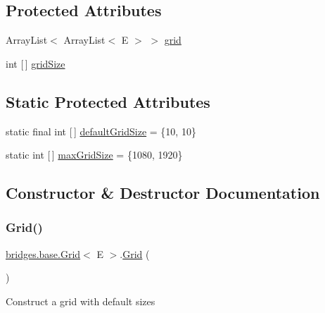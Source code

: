 \subsection*{Protected Attributes}
\begin{DoxyCompactItemize}
\item 
Array\+List$<$ Array\+List$<$ E $>$ $>$ \hyperlink{classbridges_1_1base_1_1_grid_ad1f3f6968d58188425bd992c05c655a6}{grid}
\item 
int \mbox{[}$\,$\mbox{]} \hyperlink{classbridges_1_1base_1_1_grid_a54a66479f78022570253d771206a0420}{grid\+Size}
\end{DoxyCompactItemize}
\subsection*{Static Protected Attributes}
\begin{DoxyCompactItemize}
\item 
static final int \mbox{[}$\,$\mbox{]} \hyperlink{classbridges_1_1base_1_1_grid_a45c2786d2af83624202192857a27724f}{default\+Grid\+Size} = \{10, 10\}
\item 
static int \mbox{[}$\,$\mbox{]} \hyperlink{classbridges_1_1base_1_1_grid_a803fd4c070a22863c82581f0bb258c1c}{max\+Grid\+Size} = \{1080, 1920\}
\end{DoxyCompactItemize}


\subsection{Constructor \& Destructor Documentation}
\mbox{\label{classbridges_1_1base_1_1_grid_aa621ffc958db8341f7ce37ed78944d51}} 
\subsubsection{\texorpdfstring{Grid()}{Grid()}\hspace{0.1cm}{\footnotesize\ttfamily [1/4]}}
{\footnotesize\ttfamily \hyperlink{classbridges_1_1base_1_1_grid}{bridges.\+base.\+Grid}$<$ E $>$.\hyperlink{classbridges_1_1base_1_1_grid}{Grid} (\begin{DoxyParamCaption}{ }\end{DoxyParamCaption})}

Construct a grid with default sizes \mbox{\label{classbridges_1_1base_1_1_grid_a9818d4959813f1292c6a234bc6f6aa9e}} 
